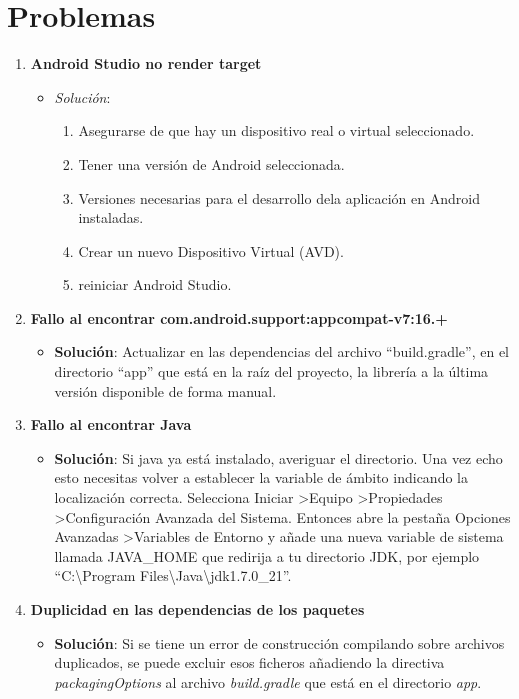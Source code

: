 %
%
%
%

\cleardoublepage
\chapter{Problemas}
\label{chap:troubles}

	\begin{enumerate}
		\item {\bf Android Studio no render target}
			\begin{itemize}
				\item {\em Solución}:
					\begin{enumerate}
						\item Asegurarse de que hay un dispositivo real o virtual seleccionado.
						\item Tener una versión de Android seleccionada.
						\item Versiones necesarias para el desarrollo dela aplicación en Android instaladas.
						\item Crear un nuevo Dispositivo Virtual (AVD).
						\item reiniciar Android Studio.
					\end{enumerate}
			\end{itemize}
		\item {\bf Fallo al encontrar com.android.support:appcompat-v7:16.+}
			\begin{itemize}
				\item {\bf Solución}: Actualizar en las dependencias del archivo ``build.gradle'', en el directorio ``app'' que está en la raíz del proyecto, la librería a la última versión disponible de forma manual.
			\end{itemize}
		\item {\bf Fallo al encontrar Java}
			\begin{itemize}
				\item {\bf Solución}: Si java ya está instalado, averiguar el directorio. Una vez echo esto necesitas volver a establecer la variable de ámbito indicando la localización correcta.
				Selecciona Iniciar \textgreater Equipo \textgreater Propiedades \textgreater Configuración Avanzada del Sistema.
				Entonces abre la pestaña Opciones Avanzadas \textgreater Variables de Entorno y añade una nueva variable de sistema llamada JAVA\_HOME que redirija a tu directorio JDK, por ejemplo ``C:{\textbackslash}Program Files{\textbackslash}Java{\textbackslash}jdk1.7.0\_21''. 
			\end{itemize}
		\item {\bf Duplicidad en las dependencias de los paquetes}
			\begin{itemize}
				\item {\bf Solución}: Si se tiene un error de construcción compilando sobre archivos duplicados, se puede excluir esos ficheros añadiendo la directiva {\it packagingOptions} al archivo {\it build.gradle} que está en el directorio {\it app}.
				

\end{itemize}
\end{enumerate}
